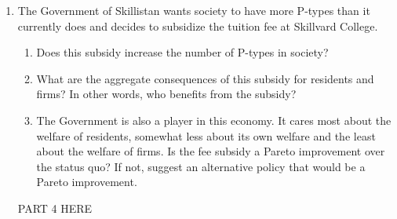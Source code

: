 \documentclass[12pt]{article}
\begin{document}
\begin{enumerate}
	\item{The Government of Skillistan wants society to have more P-types than it currently
does and decides to subsidize the tuition fee at Skillvard College.}

\begin{enumerate}

	\item{Does this subsidy increase the number of P-types in society?}
	\item{What are the aggregate consequences of this subsidy for residents and firms? In
other words, who benefits from the subsidy?}
	\item{The Government is also a player in this economy. It cares most about the welfare
of residents, somewhat less about its own welfare and the least about the
welfare of firms. Is the fee subsidy a Pareto improvement over the status quo?
If not, suggest an alternative policy that would be a Pareto improvement.}

\end{enumerate}

PART 4 HERE


\end{enumerate}
\end{document}
